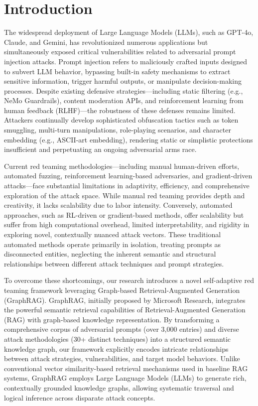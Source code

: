 
\section{Introduction}

The widespread deployment of Large Language Models (LLMs), such as GPT-4o, Claude, and Gemini, has revolutionized numerous applications but simultaneously exposed critical vulnerabilities related to adversarial prompt injection attacks. Prompt injection refers to maliciously crafted inputs designed to subvert LLM behavior, bypassing built-in safety mechanisms to extract sensitive information, trigger harmful outputs, or manipulate decision-making processes. Despite existing defensive strategies—including static filtering (e.g., NeMo Guardrails\cite{nvidia2023nemo}), content moderation APIs, and reinforcement learning from human feedback (RLHF)—the robustness of these defenses remains limited. Attackers continually develop sophisticated obfuscation tactics such as token smuggling, multi-turn manipulations, role-playing scenarios, and character embedding (e.g., ASCII-art embedding), rendering static or simplistic protections insufficient and perpetuating an ongoing adversarial arms race.

Current red teaming methodologies—including manual human-driven efforts, automated fuzzing\cite{yu2024llmfuzzer}, reinforcement learning-based adversaries, and gradient-driven attacks—face substantial limitations in adaptivity, efficiency, and comprehensive exploration of the attack space. While manual red teaming provides depth and creativity, it lacks scalability due to labor intensity. Conversely, automated approaches, such as RL-driven or gradient-based methods, offer scalability but suffer from high computational overhead, limited interpretability, and rigidity in exploring novel, contextually nuanced attack vectors. These traditional automated methods operate primarily in isolation, treating prompts as disconnected entities, neglecting the inherent semantic and structural relationships between different attack techniques and prompt strategies.

To overcome these shortcomings, our research introduces a novel self-adaptive red teaming framework leveraging Graph-based Retrieval-Augmented Generation (GraphRAG). GraphRAG, initially proposed by Microsoft Research, integrates the powerful semantic retrieval capabilities of Retrieval-Augmented Generation (RAG) with graph-based knowledge representation. By transforming a comprehensive corpus of adversarial prompts (over 3,000 entries) and diverse attack methodologies (30+ distinct techniques) into a structured semantic knowledge graph, our framework explicitly encodes intricate relationships between attack strategies, vulnerabilities, and target model behaviors. Unlike conventional vector similarity-based retrieval mechanisms used in baseline RAG systems, GraphRAG employs Large Language Models (LLMs) to generate rich, contextually grounded knowledge graphs, allowing systematic traversal and logical inference across disparate attack concepts.

